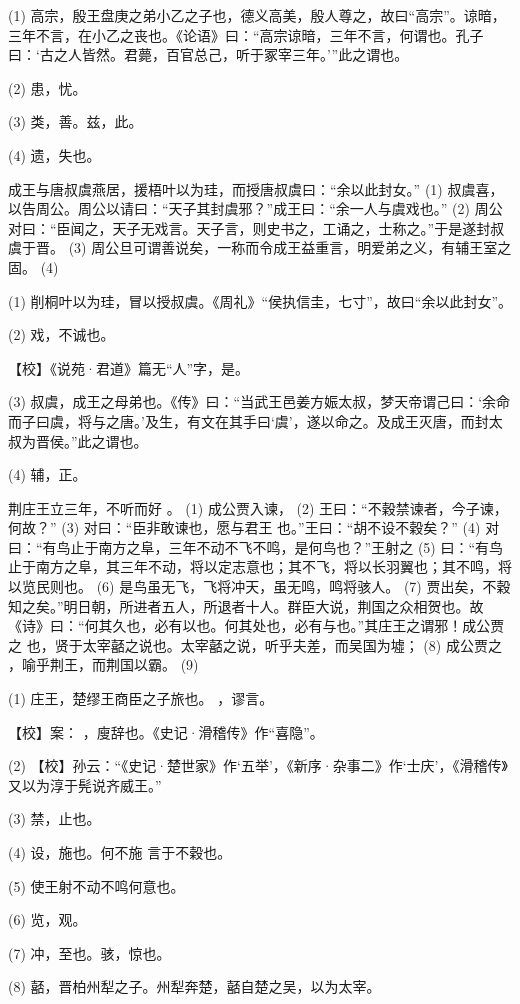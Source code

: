 \documentclass[12pt,UTF8]{ctexbook}
\begin{document}
(1) 高宗，殷王盘庚之弟小乙之子也，德义高美，殷人尊之，故曰“高宗”。谅暗，三年不言，在小乙之丧也。《论语》曰：“高宗谅暗，三年不言，何谓也。孔子曰：‘古之人皆然。君薨，百官总己，听于冢宰三年。’”此之谓也。

(2) 患，忧。

(3) 类，善。兹，此。

(4) 遗，失也。

成王与唐叔虞燕居，援梧叶以为珪，而授唐叔虞曰：“余以此封女。” (1) 叔虞喜，以告周公。周公以请曰：“天子其封虞邪？”成王曰：“余一人与虞戏也。” (2) 周公对曰：“臣闻之，天子无戏言。天子言，则史书之，工诵之，士称之。”于是遂封叔虞于晋。 (3) 周公旦可谓善说矣，一称而令成王益重言，明爱弟之义，有辅王室之固。 (4)

(1) 削桐叶以为珪，冒以授叔虞。《周礼》“侯执信圭，七寸”，故曰“余以此封女”。

(2) 戏，不诚也。

【校】《说苑·君道》篇无“人”字，是。

(3) 叔虞，成王之母弟也。《传》曰：“当武王邑姜方娠太叔，梦天帝谓己曰：‘余命而子曰虞，将与之唐。’及生，有文在其手曰‘虞’，遂以命之。及成王灭唐，而封太叔为晋侯。”此之谓也。

(4) 辅，正。

荆庄王立三年，不听而好 。 (1) 成公贾入谏， (2) 王曰：“不穀禁谏者，今子谏，何故？” (3) 对曰：“臣非敢谏也，愿与君王 也。”王曰：“胡不设不穀矣？” (4) 对曰：“有鸟止于南方之阜，三年不动不飞不鸣，是何鸟也？”王射之 (5) 曰：“有鸟止于南方之阜，其三年不动，将以定志意也；其不飞，将以长羽翼也；其不鸣，将以览民则也。 (6) 是鸟虽无飞，飞将冲天，虽无鸣，鸣将骇人。 (7) 贾出矣，不穀知之矣。”明日朝，所进者五人，所退者十人。群臣大说，荆国之众相贺也。故《诗》曰：“何其久也，必有以也。何其处也，必有与也。”其庄王之谓邪！成公贾之 也，贤于太宰嚭之说也。太宰嚭之说，听乎夫差，而吴国为墟； (8) 成公贾之 ，喻乎荆王，而荆国以霸。 (9)

(1) 庄王，楚缪王商臣之子旅也。 ，谬言。

【校】案： ，廋辞也。《史记·滑稽传》作“喜隐”。

(2) 【校】孙云：“《史记·楚世家》作‘五举’，《新序·杂事二》作‘士庆’，《滑稽传》又以为淳于髡说齐威王。”

(3) 禁，止也。

(4) 设，施也。何不施 言于不穀也。

(5) 使王射不动不鸣何意也。

(6) 览，观。

(7) 冲，至也。骇，惊也。

(8) 嚭，晋柏州犁之子。州犁奔楚，嚭自楚之吴，以为太宰。
\end{document}
